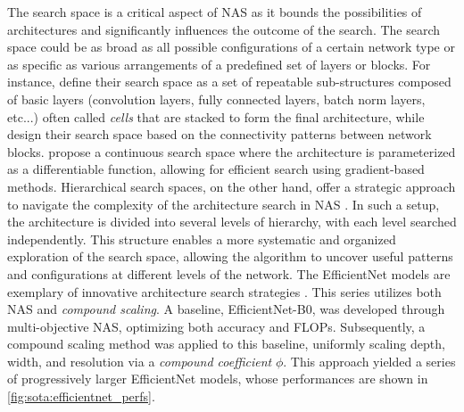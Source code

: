 The search space is a critical aspect of \ac{NAS} as it bounds the possibilities
of architectures and significantly influences the outcome of the search. The
search space could be as broad as all possible configurations of a certain
network type or as specific as various arrangements of a predefined set of
layers or blocks. For instance, \cite{DBLP:conf/iclr/ZophL17} define their
search space as a set of repeatable sub-structures composed of basic layers
(convolution layers, fully connected layers, \ac{batch norm} layers, etc...)
often called \emph{cells} that are stacked to form the final architecture, while
\cite{DBLP:conf/iclr/XieZLL19} design their search space based on the
connectivity patterns between network blocks. \cite{DBLP:conf/iclr/LiuSY19}
propose a continuous search space where the architecture is parameterized as a
differentiable function, allowing for efficient search using gradient-based
methods. Hierarchical search spaces, on the other hand, offer a strategic
approach to navigate the complexity of the architecture search in \ac{NAS}
\cite{DBLP:conf/cvpr/LiuCSAHY019,DBLP:conf/cvpr/TanCPVSHL19}. In such a setup,
the architecture is divided into several levels of hierarchy, with each level
searched independently. This structure enables a more systematic and organized
exploration of the search space, allowing the algorithm to uncover useful
patterns and configurations at different levels of the network. The EfficientNet
models are exemplary of innovative architecture search strategies
\cite{DBLP:conf/icml/TanL19}. This series utilizes both \ac{NAS} and
\emph{compound scaling}. A baseline, EfficientNet-B0, was developed through
multi-objective \ac{NAS}, optimizing both accuracy and \acp{FLOP}. Subsequently, a
compound scaling method was applied to this baseline, uniformly scaling depth,
width, and resolution via a \emph{compound coefficient} $\phi$. This approach
yielded a series of progressively larger EfficientNet models, whose performances
are shown in \ref{fig:sota:efficientnet_perfs}.\\\


